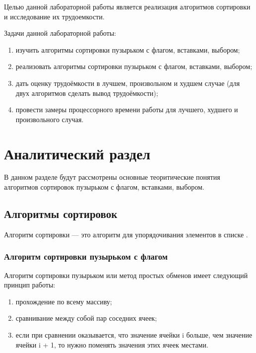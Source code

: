 \documentclass[utf8x, 12pt]{G7-32}
\begin{document}
    Целью данной лабораторной работы является реализация алгоритмов сортировки и
    исследование их трудоемкости.

    Задачи данной лабораторной работы:
    \begin{enumerate}
        \item изучить алгоритмы сортировки пузырьком с флагом, вставками, выбором;
        \item реализовать алгоритмы сортировки пузырьком с флагом, вставками, выбором;
        \item дать оценку трудоёмкости в лучшем, произвольном и худшем случае (для двух алгоритмов сделать вывод трудоёмкости);
        \item провести замеры процессорного времени работы для лучшего, худшего и произвольного случая.
    \end{enumerate}

\newpage

\mainmatter %
\chapter{ Аналитический раздел}
\label{cha:analytical}
    В данном разделе будут рассмотрены основные теоритические понятия алгоритмов сортировок
    пузырьком с флагом, вставками, выбором.

    \section{Алгоритмы сортировок}
	Алгоритм сортировки — это алгоритм для упорядочивания элементов в списке \cite{link3} .
        \subsection{ Алгоритм сортировки пузырьком с флагом}
            Алгоритм сортировки пузырьком или метод простых обменов имеет следующий 
            принцип работы:
            \begin{enumerate}
                \item прохождение по всему массиву;
                \item сравнивание между собой пар соседних ячеек;
                \item если при сравнении оказывается, что значение ячейки i больше, чем значение ячейки i + 1,
                то нужно поменять значения этих ячеек местами.
            \end{enumerate}
\end{document}
